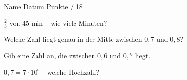 \documentclass[11pt]{article}
\begin{document}
{}
\par\vspace{2pt}\noindent Name \underline{\hspace{7cm}}\hfill Datum \underline{\hspace{3cm}}\hfill Punkte \underline{\hspace{1.2cm}} / 18\par\vspace{6pt}
\small

\noindent\begin{minipage}[t]{0.485\linewidth}\raggedright
\begin{aufgabe}{$\frac{2}{3}$ von $45$ min – wie viele Minuten? \leerfeld[min]}
\end{aufgabe}
\end{minipage}\hfill\begin{minipage}[t]{0.485\linewidth}\raggedright
\begin{aufgabe}{Welche Zahl liegt genau in der Mitte zwischen $0{,}7$ und $0{,}8$? \leerfeld}
\end{aufgabe}
\end{minipage}\par

\noindent\begin{minipage}[t]{0.485\linewidth}\raggedright
\begin{aufgabe}{Gib eine Zahl an, die zwischen $0{,}6$ und $0{,}7$ liegt. \leerfeld}
\end{aufgabe}
\end{minipage}\hfill\begin{minipage}[t]{0.485\linewidth}\raggedright
\begin{aufgabe}{$0{,}7 = 7 \cdot 10^{\square}$ – welche Hochzahl? \leerfeld}
\end{aufgabe}
\end{minipage}\par
\end{document}
